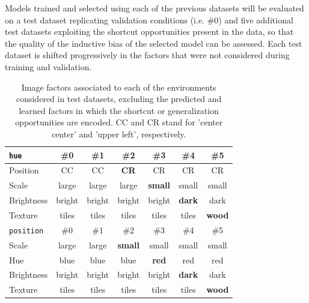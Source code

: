 \begin{dataset}
\begin{figure}[H]
\begin{subfigure}[b]{0.45\textwidth}
\begin{subfigure}[b]{0.48\textwidth}
            \end{subfigure}
        \end{subfigure}
    \end{figure}
\end{dataset}

Models trained and selected using each of the previous datasets will be evaluated
on a test dataset replicating validation conditions (i.e. \#0) and five additional test
datasets exploiting the shortcut opportunities present in the data, so that the quality of
the inductive bias of the selected model can be assessed. Each test dataset is shifted 
progressively in the factors that were not considered during training and validation.

\begin{table}[H]
    \centering
    \begin{tabular}{l|c|c|c|c|c|c}
    \texttt{hue} & \#0 & \#1 & \#2 & \#3 & \#4 & \#5 \\
    \midrule
    Position & CC & CC & \textbf{CR} & CR & CR & CR \\
    Scale & large & large & large & \textbf{small} & small & small \\
    Brightness & bright & bright & bright & bright & \textbf{dark} & dark \\
    Texture & tiles & tiles & tiles & tiles & tiles & \textbf{wood} \\
    \midrule
    \addlinespace
    \addlinespace
    \texttt{position} & \#0 & \#1 & \#2 & \#3 & \#4 & \#5 \\
    \midrule
    Scale & large & large & \textbf{small} & small & small & small \\
    Hue & blue & blue & blue & \textbf{red} & red & red \\
    Brightness & bright & bright & bright & bright & \textbf{dark} & dark \\
    Texture & tiles & tiles & tiles & tiles & tiles & \textbf{wood} \\
    \bottomrule
    \end{tabular}
    \caption{
        Image factors associated to each of the environments considered in test datasets,
        excluding the predicted and learned factors in which the shortcut or generalization
        opportunities are encoded. CC and CR stand for 'center center' and 'upper left', respectively.
    }
    \label{tab:sogo_test}
\end{table}




 \cleardoublepage

